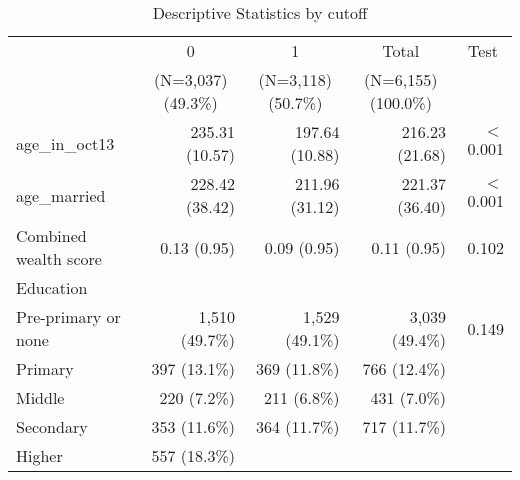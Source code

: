 \documentclass{article}
\begin{document}
\begin{table}[!h]
\caption{Descriptive Statistics by cutoff}
\centering
\begin{tabular}{lllll}
\cline{1-5}
\multicolumn{1}{r}{} &
  \multicolumn{1}{c}{0} &
  \multicolumn{1}{c}{1} &
  \multicolumn{1}{c}{Total} &
  \multicolumn{1}{c}{Test} \\
\multicolumn{1}{r}{} &
  \multicolumn{1}{c}{(N=3,037) (49.3\%)} &
  \multicolumn{1}{c}{(N=3,118) (50.7\%)} &
  \multicolumn{1}{c}{(N=6,155) (100.0\%)} &
  \multicolumn{1}{r}{} \\
\cline{1-5}
\multicolumn{1}{l}{age\_in\_oct13} &
  \multicolumn{1}{r}{235.31 (10.57)} &
  \multicolumn{1}{r}{197.64 (10.88)} &
  \multicolumn{1}{r}{216.23 (21.68)} &
  \multicolumn{1}{r}{$<$0.001} \\
\multicolumn{1}{l}{age\_married} &
  \multicolumn{1}{r}{228.42 (38.42)} &
  \multicolumn{1}{r}{211.96 (31.12)} &
  \multicolumn{1}{r}{221.37 (36.40)} &
  \multicolumn{1}{r}{$<$0.001} \\
\multicolumn{1}{l}{Combined wealth score} &
  \multicolumn{1}{r}{0.13 (0.95)} &
  \multicolumn{1}{r}{0.09 (0.95)} &
  \multicolumn{1}{r}{0.11 (0.95)} &
  \multicolumn{1}{r}{0.102} \\
\multicolumn{1}{l}{Education} &
  \multicolumn{1}{r}{} &
  \multicolumn{1}{r}{} &
  \multicolumn{1}{r}{} &
  \multicolumn{1}{r}{} \\
\multicolumn{1}{l}{\hspace{1em}Pre-primary or none} &
  \multicolumn{1}{r}{1,510 (49.7\%)} &
  \multicolumn{1}{r}{1,529 (49.1\%)} &
  \multicolumn{1}{r}{3,039 (49.4\%)} &
  \multicolumn{1}{r}{0.149} \\
\multicolumn{1}{l}{\hspace{1em}Primary} &
  \multicolumn{1}{r}{397 (13.1\%)} &
  \multicolumn{1}{r}{369 (11.8\%)} &
  \multicolumn{1}{r}{766 (12.4\%)} &
  \multicolumn{1}{r}{} \\
\multicolumn{1}{l}{\hspace{1em}Middle} &
  \multicolumn{1}{r}{220 (7.2\%)} &
  \multicolumn{1}{r}{211 (6.8\%)} &
  \multicolumn{1}{r}{431 (7.0\%)} &
  \multicolumn{1}{r}{} \\
\multicolumn{1}{l}{\hspace{1em}Secondary} &
  \multicolumn{1}{r}{353 (11.6\%)} &
  \multicolumn{1}{r}{364 (11.7\%)} &
  \multicolumn{1}{r}{717 (11.7\%)} &
  \multicolumn{1}{r}{} \\
\multicolumn{1}{l}{\hspace{1em}Higher} &
  \multicolumn{1}{r}{557 (18.3\%)} &

\end{tabular}
\end{table}
\end{document}
